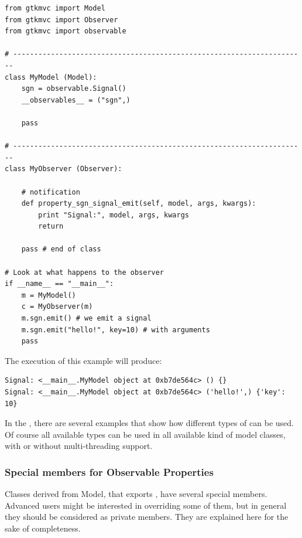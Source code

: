 { \codesize 
\begin{verbatim} 
from gtkmvc import Model
from gtkmvc import Observer
from gtkmvc import observable

# ----------------------------------------------------------------------
class MyModel (Model):
    sgn = observable.Signal()
    __observables__ = ("sgn",)

    pass

# ----------------------------------------------------------------------
class MyObserver (Observer):

    # notification
    def property_sgn_signal_emit(self, model, args, kwargs):
        print "Signal:", model, args, kwargs
        return

    pass # end of class

# Look at what happens to the observer
if __name__ == "__main__":
    m = MyModel()
    c = MyObserver(m)
    m.sgn.emit() # we emit a signal
    m.sgn.emit("hello!", key=10) # with arguments
    pass
\end{verbatim}
}

The execution of this example will produce:

{ \codesize 
\begin{verbatim} 
Signal: <__main__.MyModel object at 0xb7de564c> () {}
Signal: <__main__.MyModel object at 0xb7de564c> ('hello!',) {'key': 10}
\end{verbatim}
}

In the , there are several examples that show how
different types of \OPS can be used. Of course all available types can
be used in all available kind of model classes, with or without
multi-threading support.

  
\subsubsection{Special members for Observable Properties}
Classes derived from Model, that exports \OPS, have several special
members. Advanced users might be interested in overriding some of them,
but in general they should be considered as private members. They are
explained here for the sake of completeness.


